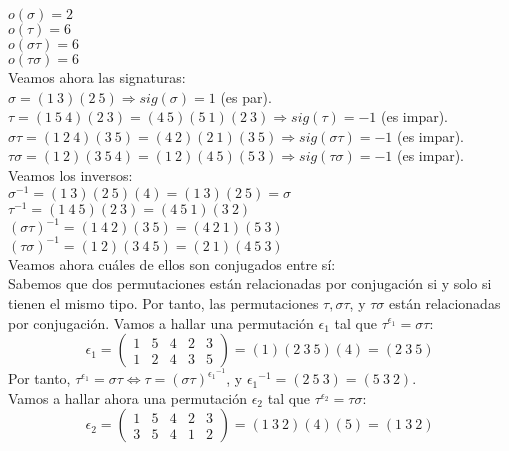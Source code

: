 \documentclass{article}
\begin{document}
$o(\sigma) = 2$\\
$o(\tau) = 6$\\
$o(\sigma \tau) = 6$\\
$o(\tau \sigma) = 6$\\
Veamos ahora las signaturas:\\
$\sigma = (1 \ 3)(2 \ 5) \Longrightarrow sig(\sigma) = 1$ (es par).\\
$\tau = (1 \ 5 \ 4)(2 \ 3) = (4 \ 5)(5 \ 1)(2 \ 3) \Longrightarrow sig(\tau) = -1$ (es impar).\\
$\sigma \tau = (1 \ 2 \ 4)(3 \ 5) = (4 \ 2)(2 \ 1)(3 \ 5)\Longrightarrow sig(\sigma \tau) = -1$ (es impar).\\
$\tau \sigma = (1 \ 2)(3 \ 5 \ 4) = (1 \ 2)(4 \ 5)(5 \ 3) \Longrightarrow sig(\tau \sigma) = -1$ (es impar).\\
Veamos los inversos:\\
$\sigma^{-1} = (1 \ 3)(2 \ 5)(4) = (1 \ 3)(2 \ 5) = \sigma$\\
$\tau^{-1} = (1 \ 4 \ 5)(2 \ 3) = (4 \ 5 \ 1)(3 \ 2)$\\
$(\sigma \tau)^{-1} = (1 \ 4 \ 2)(3 \ 5) = (4 \ 2 \ 1)(5 \ 3)$\\
$(\tau \sigma)^{-1} = (1 \ 2)(3 \ 4 \ 5) = (2 \ 1)(4 \ 5 \ 3)$\\
Veamos ahora cuáles de ellos son conjugados entre sí:\\
Sabemos que dos permutaciones están relacionadas por conjugación si y solo si tienen el mismo tipo. Por tanto, las permutaciones $\tau, \sigma\tau$, y $\tau \sigma$ están relacionadas por conjugación. Vamos a hallar una permutación $\epsilon_1$ tal que $\tau^{\epsilon_1} = \sigma \tau$:\\
$$
\epsilon_1 = \left(
  \begin{array}{ccccc}
    1 & 5 & 4 & 2 & 3 \\
    1 & 2 & 4 & 3 & 5
\end{array} \right) = (1)(2 \ 3 \ 5)(4) = (2 \ 3 \ 5)
$$
Por tanto, $\tau^{\epsilon_1} = \sigma \tau \iff \tau = (\sigma \tau)^{{\epsilon_1}^{-1}}$, y ${\epsilon_1}^{-1} = (2 \ 5 \ 3) = (5 \ 3 \ 2)$.\\
Vamos a hallar ahora una permutación $\epsilon_2$ tal que $\tau^{\epsilon_2} = \tau \sigma$:\\
$$
\epsilon_2 = \left(
  \begin{array}{ccccc}
    1 & 5 & 4 & 2 & 3 \\
    3 & 5 & 4 & 1 & 2
\end{array} \right) = (1 \ 3 \ 2)(4)(5) = (1 \ 3 \ 2)
$$
\end{document}
